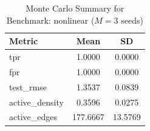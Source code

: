 \begin{table}[ht]
\centering
\caption{Monte Carlo Summary for Benchmark: nonlinear ($M = 3$ seeds)}
\begin{tabular}{lcc}
\hline
Metric & Mean & SD \\
\hline
tpr & 1.0000 & 0.0000 \\
fpr & 1.0000 & 0.0000 \\
test\_rmse & 1.3537 & 0.0839 \\
active\_density & 0.3596 & 0.0275 \\
active\_edges & 177.6667 & 13.5769 \\
\hline
\end{tabular}
\end{table}
